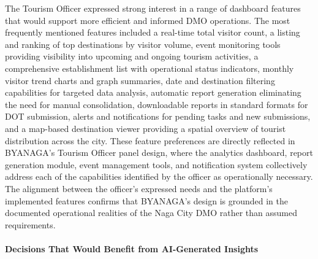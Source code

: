 \documentclass{research}
\begin{document}
The Tourism Officer expressed strong interest in a range of dashboard features
that would support more efficient and informed DMO operations. The most
frequently mentioned features included a real-time total visitor count, a
listing and ranking of top destinations by visitor volume, event monitoring
tools providing visibility into upcoming and ongoing tourism activities,
a comprehensive establishment list with operational status indicators,
monthly visitor trend charts and graph summaries, date and destination
filtering capabilities for targeted data analysis, automatic report
generation eliminating the need for manual consolidation, downloadable
reports in standard formats for DOT submission, alerts and notifications
for pending tasks and new submissions, and a map-based destination viewer
providing a spatial overview of tourist distribution across the city. These
feature preferences are directly reflected in BYANAGA's Tourism Officer
panel design, where the analytics dashboard, report generation module,
event management tools, and notification system collectively address
each of the capabilities identified by the officer as operationally
necessary. The alignment between the officer's expressed needs and the
platform's implemented features confirms that BYANAGA's design is grounded
in the documented operational realities of the Naga City DMO rather than
assumed requirements.


\paragraph{Decisions That Would Benefit from AI-Generated Insights}
\end{document}
